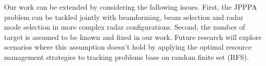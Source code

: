 \documentclass[12pt,journal,draftclsnofoot,onecolumn]{IEEEtran}
\begin{document}
Our work can be extended by considering the following issues. First, the JPPPA problem can be tackled jointly with beamforming, beam selection and radar mode selection in more complex radar configurations. Second, the number of target is assumed to be known and fixed in our work. Future research will explore scenarios where this assumption doesn't hold by applying the optimal resource management strategies to tracking problems base on random finite set (RFS).



\end{document}

